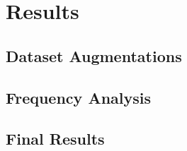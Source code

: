
\chapter{Results}\label{chapter:results}

\section{Dataset Augmentations}\label{chapter:art}
\section{Frequency Analysis}\label{chapter:media}
\section{Final Results}\label{chapter:cybersecurity}
